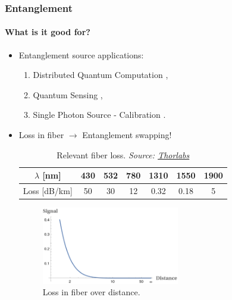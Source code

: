 \documentclass[serif,8pt]{beamer}
\begin{document}
\begin{frame}[t]
	\frametitle{Entanglement}
	\framesubtitle{What is it good for?}
	\begin{itemize}
		\item Entanglement source applications:
			\begin{enumerate}
				\item Distributed Quantum Computation \cite{QuComp}, %
				\item Quantum Sensing \cite{QuSens},
				\item Single Photon Source - Calibration \cite{QuCal}.
			\end{enumerate}
		\item Loss in fiber $\rightarrow$ Entanglement swapping!
	\begin{table}
		\caption{Relevant fiber loss. \textit{Source: \href{https://www.thorlabs.com/newgrouppage9.cfm?objectgroup_id=949}{Thorlabs}}}
		\label{tab:fiberloss}
		\begin{tabular}{|c|c|c|c|c|c|c|}
			\hline
			$\lambda$ [nm] & 430 & 532 & 780 & 1310 & 1550 & 1900\\
			\hline
			Loss [dB/km] & 50 & 30 & 12 & 0.32 &  0.18 & 5\\
			\hline
		\end{tabular}
	\end{table}
	\begin{figure}
		\begin{center}
			\includegraphics[width=6cm]{FiberLoss.png}
		\end{center}
		\caption{Loss in fiber over distance.}\label{fig:fiberloss}
	\end{figure}
	\end{itemize}
\end{frame}
\end{document}
